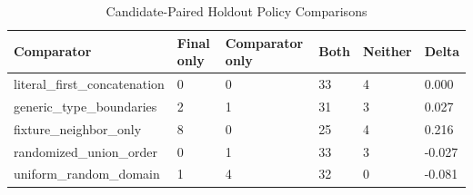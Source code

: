 \begin{table}[t]
\centering
\small
\begin{tabular}{llllll}
\toprule
Comparator & Final only & Comparator only & Both & Neither & Delta \\
\midrule
literal\_first\_concatenation & 0 & 0 & 33 & 4 & 0.000 \\
generic\_type\_boundaries & 2 & 1 & 31 & 3 & 0.027 \\
fixture\_neighbor\_only & 8 & 0 & 25 & 4 & 0.216 \\
randomized\_union\_order & 0 & 1 & 33 & 3 & -0.027 \\
uniform\_random\_domain & 1 & 4 & 32 & 0 & -0.081 \\
\bottomrule
\end{tabular}
\caption{Candidate-Paired Holdout Policy Comparisons}
\end{table}
